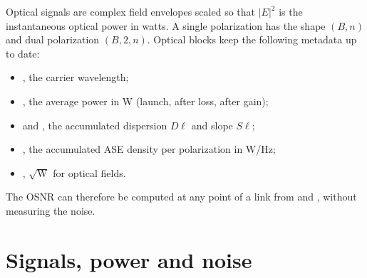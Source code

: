 \begin{incode}
Optical signals are complex field envelopes scaled so that $|E|^2$ is the instantaneous optical
power in watts. A single polarization has the shape $(B,n)$ and dual polarization $(B,2,n)$.
Optical blocks keep the following metadata up to date:
\begin{itemize}
  \item {}, the carrier wavelength;
  \item {}, the average power in W (launch, after loss, after gain);
  \item {} and , the accumulated dispersion $D\ell$ and slope $S\ell$;
  \item {}, the accumulated ASE density per polarization in W/Hz;
  \item {}, $\sqrt{\mathrm W}$ for optical fields.
\end{itemize}
The OSNR can therefore be computed at any point of a link from  and
, without measuring the noise.
\end{incode}

\section{Signals, power and noise}\label{sec:opt-signals}
